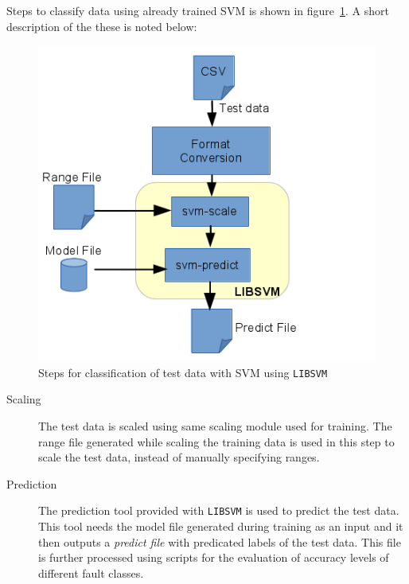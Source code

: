 Steps to classify data using already trained SVM is shown in figure~\ref{fig:libsvmpredict}. A short description of the these is noted below:

\begin{figure}[h]
  \begin{center}
    \captionsetup{justification=centering}
    \includegraphics[scale=0.75]{figures/libsvmpredict.png}
    \caption{Steps for classification of test data with SVM using \texttt{LIBSVM}}
    \label{fig:libsvmpredict}
  \end{center}
\end{figure}

\begin{description}

  \item[Scaling] The test data is scaled using same scaling module used for training. The range file generated while scaling the training data is used in this step to scale the test data, instead of manually specifying ranges.
  
  \item[Prediction] The prediction tool provided with \texttt{LIBSVM} is used to predict the test data. This tool needs the model file generated during training as an input and it then outputs a \emph{predict file} with predicated labels of the test data. This file is further processed using scripts for the evaluation of accuracy levels of different fault classes.
  
\end{description}
